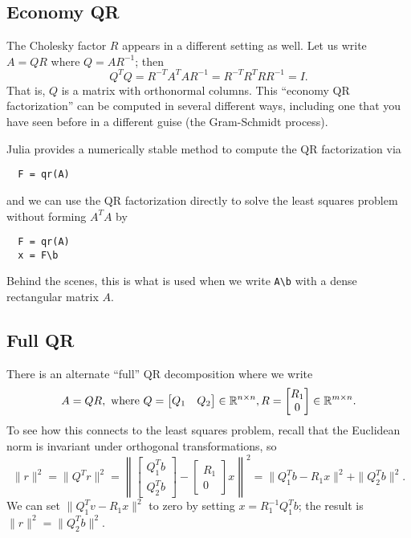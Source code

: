 \documentclass[12pt, leqno]{article} %
\begin{document}
\subsection{Economy QR}

The Cholesky factor $R$ appears in a different setting as well.
Let us write $A = QR$ where $Q = AR^{-1}$; then
\[
  Q^T Q = R^{-T} A^T A R^{-1} = R^{-T} R^T R R^{-1} = I.
\]
That is, $Q$ is a matrix with orthonormal columns.  This
``economy QR factorization'' can be computed in several different
ways, including one that you have seen before in a different guise
(the Gram-Schmidt process).

Julia provides a numerically stable
method to compute the QR factorization via
\begin{lstlisting}
  F = qr(A)
\end{lstlisting}
and we can use the QR factorization directly to solve the least
squares problem without forming $A^T A$ by
\begin{lstlisting}
  F = qr(A)
  x = F\b
\end{lstlisting}
Behind the scenes, this is what is used when we write \verb|A\b| with
a dense rectangular matrix $A$.

\subsection{Full QR}

There is an alternate ``full'' QR decomposition where we write
\[
A = QR, \mbox{ where }
Q = \begin{bmatrix} Q_1 & Q_2 \end{bmatrix} \in \mathbb{R}^{n \times n},
R = \begin{bmatrix} R_{1} \\ 0 \end{bmatrix} \in \mathbb{R}^{m \times n}.
\]
To see how this connects to the least squares problem, recall
that the Euclidean norm is invariant under orthogonal transformations,
so
\[
  \|r\|^2 = \|Q^T r\|^2 = \left\| \begin{bmatrix} Q_1^T b \\ Q_2^T
    b \end{bmatrix} - \begin{bmatrix} R_1 \\ 0 \end{bmatrix} x
  \right\|^2 = \|Q_1^T b-R_1x\|^2 + \|Q_2^T b\|^2.
\]
We can set $\|Q_1^T v-R_1 x\|^2$ to zero by
setting $x = R_1^{-1} Q_1^T b$; the result is
$\|r\|^2 = \|Q_2^T b\|^2$.
\end{document}
